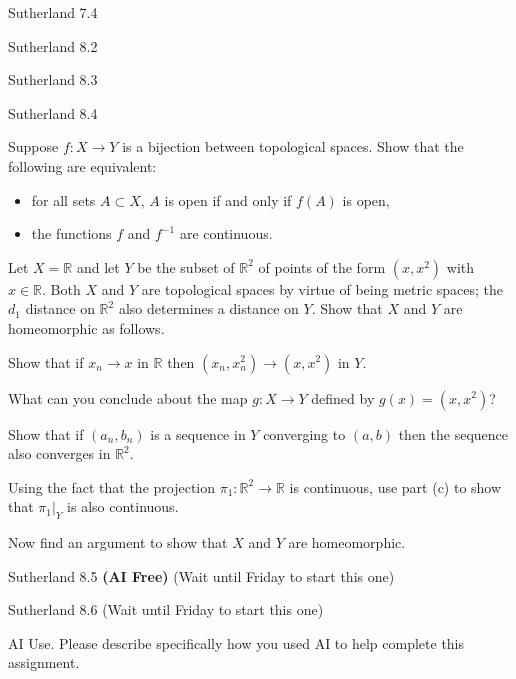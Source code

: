 \documentclass[minion]{homework}
\newcommand{\Reals}{\ensuremath{\mathbb R}}%
\begin{document}
\begin{problems}

\problem Sutherland 7.4

\problem Sutherland 8.2

\problem Sutherland 8.3

\problem Sutherland 8.4

\problem Suppose $f:X\to Y$ is a bijection between topological spaces.
Show that the following are equivalent:
\begin{itemize}
\item for all sets $A\subset  X$, $A$ is open if and only if $f(A)$ is open,
\item the functions $f$ and $f^{-1}$ are continuous.
\end{itemize}

\problem Let $X=\Reals$ and let $Y$ be the subset of $\Reals^2$ 
of points of the form $(x,x^2)$ with $x\in \Reals$. Both $X$ and $Y$
are topological spaces by virtue of being metric spaces; the $d_1$ 
distance on $\Reals^2$ also determines a distance on $Y$.
Show that $X$ and $Y$ are homeomorphic as follows.
\begin{subproblems}
\item Show that if $x_n\to x$ in $\Reals$ then $(x_n, x_n^2)\to (x,x^2)$ in $Y$.
\item What can you conclude about the map $g:X\to Y$ defined by $g(x)=(x,x^2)$?
\item Show that if $(a_n,b_n)$ is a sequence in $Y$ converging to $(a,b)$
then the sequence also converges in $\Reals^2$.
\item Using the fact that the projection $\pi_1: \Reals^2 \to \Reals$ 
is continuous, use part (c) to show that $\pi_1|_Y$ is also continuous.
\item Now find an argument to show that $X$ and $Y$ are homeomorphic.
\end{subproblems}

\problem Sutherland 8.5 \textbf{(AI Free)} (Wait until Friday to start this one)

\problem Sutherland 8.6 (Wait until Friday to start this one)

\problem AI Use. Please describe specifically how you used AI to help complete this assignment.

\end{problems}
\end{document}
